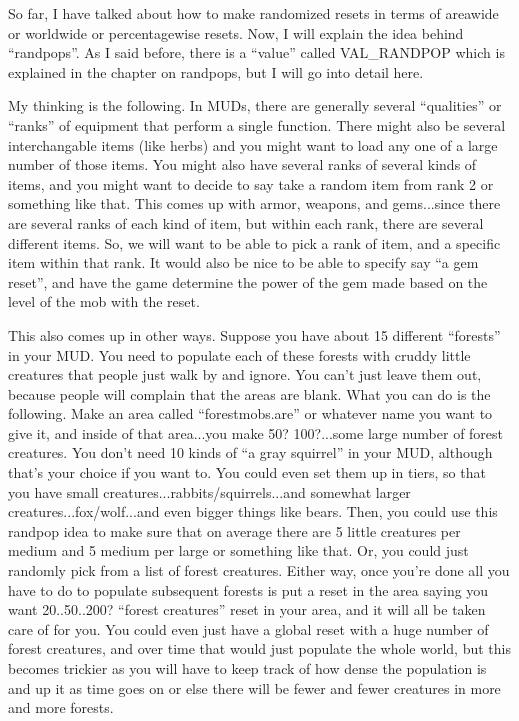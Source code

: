 So far, I have talked about how to make randomized resets in terms of
areawide or worldwide or percentagewise resets. Now, I will explain
the idea behind ``randpops''. As I said before, there is a ``value''
called VAL\_RANDPOP which is explained in the chapter on randpops,
but I will go into detail here.



My thinking is the following. In MUDs, there are generally several
``qualities'' or ``ranks'' of equipment that perform a single
function. There might also be several interchangable items (like
herbs) and you might want to load any one of a large number of
those items. You might also have several ranks of several kinds
of items, and you might want to decide to say take a random item
from rank 2 or something like that. This comes up with armor,
weapons, and gems...since there are several ranks of each kind
of item, but within each rank, there are several different items.
So, we will want to be able to pick a rank of item, and a specific
item within that rank. It would also be nice to be able to specify
say ``a gem reset'', and have the game determine the power of
the gem made based on the level of the mob with the reset.

This also comes up in other ways. Suppose you have about 15
different ``forests'' in your MUD. You need to populate each
of these forests with cruddy little creatures that people
just walk by and ignore. You can't just leave them out,
because people will complain that the areas are blank.
What you can do is the following. Make an area called
``forestmobs.are'' or whatever name you want to give it,
and inside of that area...you make 50? 100?...some large number
of forest creatures. You don't need 10 kinds of ``a gray squirrel''
in your MUD, although that's your choice if you want to.
You could even set them up in tiers, so that you have
small creatures...rabbits/squirrels...and somewhat larger
creatures...fox/wolf...and even bigger things like bears. Then,
you could use this randpop idea to make sure that on average
there are 5 little creatures per medium and 5 medium per large
or something like that. Or, you could just randomly pick from a 
list of forest creatures. Either way, once you're done all you have
to do to populate subsequent forests is put a reset in the area
saying you want 20..50..200? ``forest creatures'' reset in your
area, and it will all be taken care of for you. You could
even just have a global reset with a huge number of forest creatures,
and over time that would just populate the whole world,
but this becomes trickier as you will have to keep track of how 
dense the population is and up it as time goes on or else there
will be fewer and fewer creatures in more and more forests.





